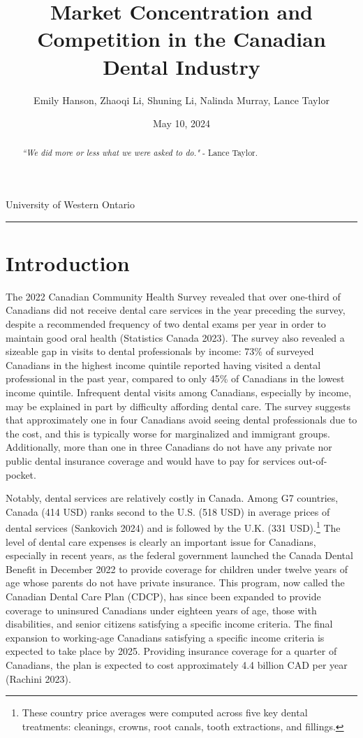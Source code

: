 \documentclass[a4paper,11pt]{article}
\title{\vspace{-1.2cm} Market Concentration and Competition in the Canadian Dental Industry}
\author{Emily Hanson, Zhaoqi Li, Shuning Li, Nalinda Murray, Lance Taylor }
\date{May 10, 2024}
\begin{document}
\maketitle \vspace{-.4 in}
\begin{center}
University of Western Ontario
\rule{\textwidth}{1pt} 
\end{center}




\begin{abstract}
\textit{``We did more or less what we were asked to do."} - Lance Taylor.
\end{abstract}

\section{Introduction}
The 2022 Canadian Community Health Survey revealed that over one-third of Canadians did not receive dental care services in the year preceding the survey, despite a recommended frequency of two dental exams per year in order to maintain good oral health (Statistics Canada 2023). The survey also revealed a sizeable gap in visits to dental professionals by income: 73\% of surveyed Canadians in the highest income quintile reported having visited a dental professional in the past year, compared to only 45\% of Canadians in the lowest income quintile. Infrequent dental visits among Canadians, especially by income, may be explained in part by difficulty affording dental care. The survey suggests that approximately one in four Canadians avoid seeing dental professionals due to the cost, and this is typically worse for marginalized and immigrant groups. Additionally, more than one in three Canadians do not have any private nor public dental insurance coverage and would have to pay for services out-of-pocket.

Notably, dental services are relatively costly in Canada. Among G7 countries, Canada (414 USD) ranks second to the U.S. (518 USD) in average prices of dental services (Sankovich 2024) and is followed by the U.K. (331 USD).\footnote{These country price averages were computed across five key dental treatments: cleanings, crowns, root canals, tooth extractions, and fillings.} The level of dental care expenses is clearly an important issue for Canadians, especially in recent years, as the federal government launched the Canada Dental Benefit in December 2022 to provide coverage for children under twelve years of age whose parents do not have private insurance. This program, now called the Canadian Dental Care Plan (CDCP), has since been expanded to provide coverage to uninsured Canadians under eighteen years of age, those with disabilities, and senior citizens satisfying a specific income criteria. The final expansion to working-age Canadians satisfying a specific income criteria is expected to take place by 2025. Providing insurance coverage for a quarter of Canadians, the plan is expected to cost approximately 4.4 billion CAD per year (Rachini 2023).
\end{document}
